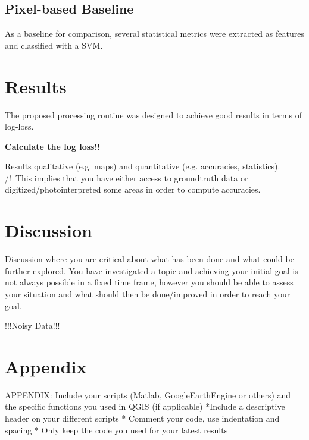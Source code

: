 \documentclass[11pt]{article}
\begin{document}
	\subsection{Pixel-based Baseline }
	As a baseline for comparison, several statistical metrics were extracted as features and classified with a SVM.
	
	
	\section{Results}
	
	The proposed processing routine was designed to achieve good results in terms of log-loss.
	
	\textbf{Calculate the log loss!!}
	
	
	Results qualitative (e.g. maps) and quantitative (e.g. accuracies, statistics). /!\ This implies that you have either access to groundtruth data or digitized/photointerpreted some areas in order to compute accuracies.
	
	\section{Discussion}
	\label{sec:discussion}
	Discussion where you are critical about what has been done and what could be further explored. You have investigated a topic and achieving your initial goal is not always possible in a fixed time frame, however you should be able to assess your situation and what should then be done/improved in order to reach your goal.
	
	
	!!!Noisy Data!!!
	
	\section{Appendix}
	APPENDIX: Include your scripts (Matlab, GoogleEarthEngine or others) and the specific functions you used in QGIS (if applicable)
	*Include a descriptive header on your different scripts
	* Comment your code, use indentation and spacing
	* Only keep the code you used for your latest results
	
	
	
	 
	
	
\end{document}
